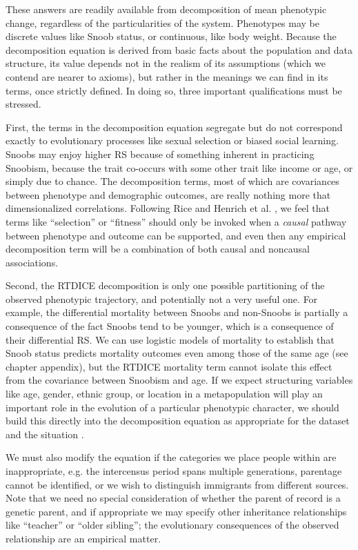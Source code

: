 These answers are readily available from decomposition of mean phenotypic change, regardless of the particularities of the system.  Phenotypes may be discrete values like Snoob status, or continuous, like body weight.  Because the decomposition equation is derived from basic facts about the population and data structure, its value depends not in the realism of its assumptions (which we contend are nearer to axioms), but rather in the meanings we can find in its terms, once strictly defined.  In doing so, three important qualifications must be stressed. 

First, the terms in the decomposition equation segregate but do not correspond exactly to evolutionary processes like sexual selection or biased social learning.  Snoobs may enjoy higher RS because of something inherent in practicing Snoobism, because the trait co-occurs with some other trait like income or age, or simply due to chance. The decomposition terms, most of which are covariances between phenotype and demographic outcomes, are really nothing more that dimensionalized correlations.  Following Rice \citeyearpar{rice2004evolutionary} and Henrich et al. \citeyearpar{Henrich2008:misunderstandings}, we feel that terms like ``selection'' or ``fitness'' should only be invoked when a \textit{causal} pathway between phenotype and outcome can be supported, and even then any empirical decomposition term will be a combination of both causal and noncausal associations. 

Second, the RTDICE decomposition is only one possible partitioning of the observed phenotypic trajectory, and potentially not a very useful one.  For example, the differential mortality between Snoobs and non-Snoobs is partially a consequence of the fact Snoobs tend to be younger, which is a consequence of their differential RS.  We can use logistic models of mortality to establish that Snoob status predicts mortality outcomes even among those of the same age (see chapter appendix), but the RTDICE mortality term cannot isolate this effect from the covariance between Snoobism and age.  If we expect structuring variables like age, gender, ethnic group, or location in a metapopulation will play an important role in the evolution of a particular phenotypic character, we should build this directly into the decomposition equation as appropriate for the dataset and the situation \citep{coulson2008dynamics}.  

We must also modify the equation if the categories we place people within are inappropriate, e.g. the intercensus period spans multiple generations, parentage cannot be identified, or we wish to distinguish immigrants from different sources.  Note that we need no special consideration of whether the parent of record is a genetic parent, and if appropriate we may specify other inheritance relationships like ``teacher'' or ``older sibling''; the evolutionary consequences of the observed relationship are an empirical matter.

